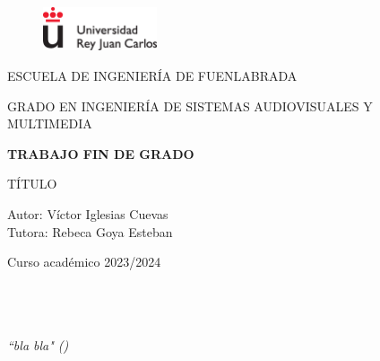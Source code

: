 \documentclass[12pt,a4paper,Spanish]{book}
\begin{document}
\renewcommand{\listtablename}{Índice de tablas} 


\begin{titlepage}
\begin{center}


\begin{figure}
	\centering
\includegraphics[width=0.3\textwidth]{./figs/logoURJC}
\end{figure}

\begin{center}
\large
ESCUELA DE INGENIERÍA DE FUENLABRADA

\vspace*{0.15in}
GRADO EN INGENIERÍA DE SISTEMAS AUDIOVISUALES Y MULTIMEDIA \\
\vspace*{0.6in}




{\large \bf TRABAJO FIN DE GRADO}\\
\end{center}
\vspace*{0.2in}
{\large
{TÍTULO} \\
}
\vspace*{0.3in}
\vspace*{0.3in}

\vspace*{0.1in}
\end{center}

{\large
Autor: Víctor Iglesias Cuevas  \\[0.2cm]

Tutora: Rebeca Goya Esteban \\[0.15cm]

}
\vspace*{0.1in}
\vspace*{0.1in}

\begin{center}Curso académico 2023/2024\end{center}



\end{titlepage}
\newpage
$\ $
\thispagestyle{empty} %

\chapter*{}
\begin{flushright}
\textit{“bla bla" ()}

\end{flushright}
\end{document}
